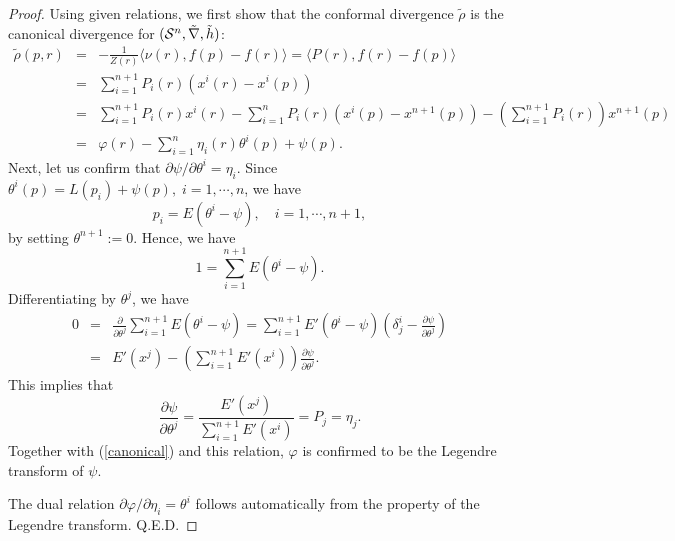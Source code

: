 \documentclass{llncs}
\begin{document}
\begin{proof}
Using given relations, we first show that the conformal divergence 
$\tilde \rho$ is the canonical divergence \cite{AN} for 
$({\cal S}^n,\tilde \nabla, \tilde h)$:
\begin{eqnarray}
	\tilde \rho(p,r)&=& 
		-\frac{1}{Z(r)} \langle \nu(r), f(p) - f(r) \rangle
		= \langle P(r), f(r) - f(p) \rangle \nonumber \\
	&=& \sum_{i=1}^{n+1} P_i(r)(x^i(r) - x^i(p)) \nonumber \\
	&=& \sum_{i=1}^{n+1} P_i(r)x^i(r) 
		- \sum_{i=1}^{n} P_i(r)(x^i(p) - x^{n+1}(p))
		- \left(\sum_{i=1}^{n+1} P_i(r) \right)x^{n+1}(p) \nonumber \\
	&=& \varphi(r) - \sum_{i=1}^{n} \eta_i(r) \theta^i(p) + \psi(p).
\label{canonical}
\end{eqnarray}
Next, let us confirm that  
$\partial \psi/\partial \theta^i = \eta_i$.
Since $\theta^i(p)=L(p_i)+\psi(p), \; i=1,\cdots,n$, we have
\[
	p_i=E(\theta^i-\psi), \quad i=1,\cdots,n+1,
\]
by setting $\theta^{n+1}:=0$.
Hence, we have 
\[
	1= \sum_{i=1}^{n+1} E(\theta^i-\psi).
\]
Differentiating by $\theta^j$, we have
\begin{eqnarray*}
	0&=& \frac{\partial}{\partial \theta^j} 
			\sum_{i=1}^{n+1} E(\theta^i-\psi)
	=\sum_{i=1}^{n+1} E'(\theta^i-\psi) \left( \delta^i_j- 
		\frac{\partial \psi}{\partial \theta^j} \right) \\
	&=& E'(x^j) - \left( \sum_{i=1}^{n+1} E'(x^i) \right)
				\frac{\partial \psi}{\partial \theta^j}.
\end{eqnarray*}
This implies that
\[
	\frac{\partial \psi}{\partial \theta^j}
	=\frac{E'(x^j)}{\sum_{i=1}^{n+1} E'(x^i)}=P_j=\eta_j.
\]
Together with (\ref{canonical}) and this relation, 
$\varphi$ is confirmed to be the Legendre transform of $\psi$.

The dual relation $\partial \varphi/\partial \eta_i = \theta^i$ follows 
automatically from the property of the Legendre transform.
\hfill Q.E.D.
\end{proof}
\end{document}
